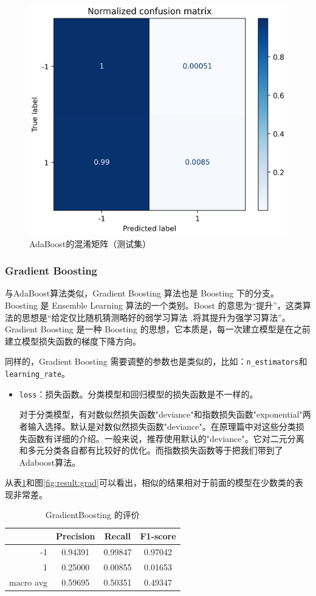 \documentclass[a4paper]{article}
\begin{document}
\begin{figure}[!h]
    \centering
    \includegraphics[width=0.48\linewidth]{AdaBoost_confus_mat-norm.png}
    \caption{AdaBoost的混淆矩阵（测试集）}
    \label{fig:result:ada}
\end{figure}

\subsubsection{Gradient Boosting}
与AdaBoost算法类似，Gradient Boosting 算法也是 Boosting 下的分支。Boosting 是 Ensemble Learning 算法的一个类别。Boost 的意思为“提升”，这类算法的思想是“给定仅比随机猜测略好的弱学习算法 ,将其提升为强学习算法”。Gradient Boosting 是一种 Boosting 的思想，它本质是，每一次建立模型是在之前建立模型损失函数的梯度下降方向。

同样的，Gradient Boosting 需要调整的参数也是类似的，比如：\texttt{n\_estimators}和\texttt{learning\_rate}。

\begin{itemize}
    \item \texttt{loss}：损失函数。分类模型和回归模型的损失函数是不一样的。

    对于分类模型，有对数似然损失函数"deviance"和指数损失函数"exponential"两者输入选择。默认是对数似然损失函数"deviance"。在原理篇中对这些分类损失函数有详细的介绍。一般来说，推荐使用默认的"deviance"。它对二元分离和多元分类各自都有比较好的优化。而指数损失函数等于把我们带到了Adaboost算法。
\end{itemize}

从表\ref{tb:grad}和图\ref{fig:result:grad}可以看出，相似的结果相对于前面的模型在少数类的表现非常差。

\begin{table}[!h]
    \centering
    \renewcommand{\arraystretch}{1.5}
    \begin{tabular}{|r|c|c|c|}
        \hline
                  & Precision & Recall & F1-score \\ \hline
        -1        &     0.94391     &     0.99847   &    0.97042      \\ \hline
        1         &     0.25000      &     0.00855   &   0.01653       \\ \hline
        macro avg &      0.59695     &     0.50351   &    0.49347      \\ \hline
    \end{tabular}
    \caption{GradientBoosting 的评价}
    \label{tb:grad}
\end{table}
\end{document}
